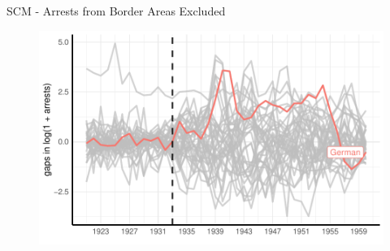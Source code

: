 \documentclass[11pt]{beamer}
\begin{document}
\begin{frame}[label=sc_non_border_area]{SCM - Arrests from Border Areas Excluded}
 \begin{figure}[h]
\centering
\includegraphics[width=1\textwidth]{placebo_highlight_all_non_border_provinces.pdf}
\end{figure}
\hyperlink{sc_robustness_checks}{}
\end{frame}
\end{document}
